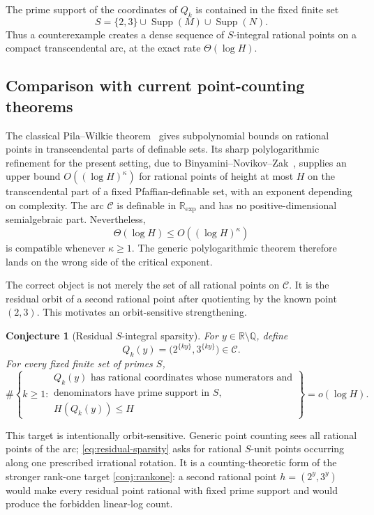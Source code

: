 \documentclass[11pt,oneside]{article}
\newtheorem{conjecture}[theorem]{Conjecture}
\theoremstyle{definition}
\newcommand{\Q}{\mathbb{Q}}
\newcommand{\R}{\mathbb{R}}
\newcommand{\Supp}{\operatorname{Supp}}
\newcommand{\cC}{\mathscr{C}}
\begin{document}
The prime support of the coordinates of $Q_k$ is contained in the fixed finite set
\[
       S=\{2,3\}\cup\Supp(M)\cup\Supp(N).
\]
Thus a counterexample creates a dense sequence of $S$-integral rational points on a compact transcendental arc, at the exact rate $\Theta(\log H)$.

\subsection{Comparison with current point-counting theorems}

The classical Pila--Wilkie theorem~\cite{PilaWilkie2006} gives subpolynomial bounds on rational points in transcendental parts of definable sets.  Its sharp polylogarithmic refinement for the present setting, due to Binyamini--Novikov--Zak~\cite{BinyaminiNovikovZak2024}, supplies an upper bound
$O((\log H)^\kappa)$ for rational points of height at most $H$ on the transcendental part of a fixed Pfaffian-definable set, with an exponent depending on complexity.  The arc $\cC$ is definable in $\R_{\exp}$ and has no positive-dimensional semialgebraic part.  Nevertheless,
\[
       \Theta(\log H)\le O((\log H)^\kappa)
\]
is compatible whenever $\kappa\ge1$.  The generic polylogarithmic theorem therefore lands on the wrong side of the critical exponent.

The correct object is not merely the set of all rational points on $\cC$.  It is the residual orbit of a second rational point after quotienting by the known point $(2,3)$.  This motivates an orbit-sensitive strengthening.

\begin{conjecture}[Residual $S$-integral sparsity]\label{conj:residualsublinear}
For $y\in\R\setminus\Q$, define
\[
   Q_k(y)=\bigl(2^{\{ky\}},3^{\{ky\}}\bigr)\in\cC.
\]
For every fixed finite set of primes $S$,
\begin{equation}\label{eq:residual-sparsity}
 \#\left\{k\ge1:
   \begin{array}{l}
     Q_k(y)\text{ has rational coordinates whose numerators and}\\[-1mm]
     \text{denominators have prime support in }S,\\[-1mm]
     H(Q_k(y))\le H
   \end{array}
   \right\}
   =o(\log H).
\end{equation}
\end{conjecture}

This target is intentionally orbit-sensitive.  Generic point counting sees all rational points of the arc; \eqref{eq:residual-sparsity} asks for rational $S$-unit points occurring along one prescribed irrational rotation.  It is a counting-theoretic form of the stronger rank-one target \cref{conj:rankone}: a second rational point $h=(2^y,3^y)$ would make every residual point rational with fixed prime support and would produce the forbidden linear-log count.
\end{document}
